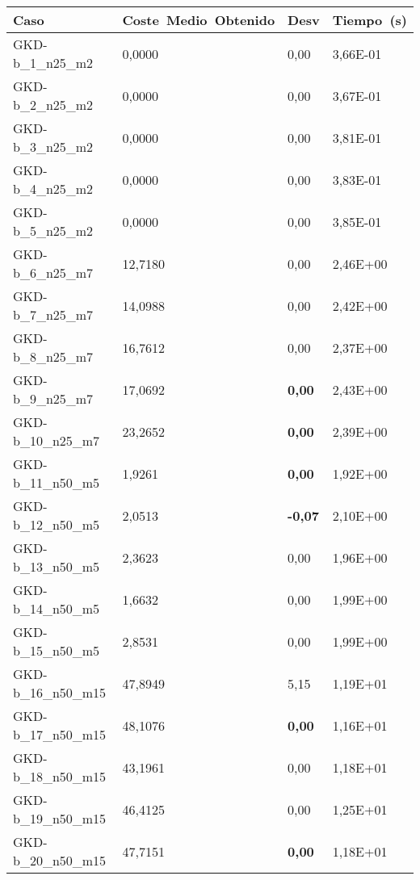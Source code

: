 \pagebreak

\begin{table}[!ht]%
    \centering    
    \begin{adjustbox}{height=12cm}
    \begin{tabular}{|l|l|l|l|}
    \hline
        Caso & Coste~Medio~Obtenido & Desv & Tiempo~(s) \\ \hline
		GKD-b\_1\_n25\_m2    & 0,0000   & 0,00           & 3,66E-01 \\ \hline
		GKD-b\_2\_n25\_m2    & 0,0000   & 0,00           & 3,67E-01 \\ \hline
		GKD-b\_3\_n25\_m2    & 0,0000   & 0,00           & 3,81E-01 \\ \hline
		GKD-b\_4\_n25\_m2    & 0,0000   & 0,00           & 3,83E-01 \\ \hline
		GKD-b\_5\_n25\_m2    & 0,0000   & 0,00           & 3,85E-01 \\ \hline
		GKD-b\_6\_n25\_m7    & 12,7180  & 0,00           & 2,46E+00 \\ \hline
		GKD-b\_7\_n25\_m7    & 14,0988  & 0,00           & 2,42E+00 \\ \hline
		GKD-b\_8\_n25\_m7    & 16,7612  & 0,00           & 2,37E+00 \\ \hline
		GKD-b\_9\_n25\_m7    & 17,0692  & \textbf{0,00}  & 2,43E+00 \\ \hline
		GKD-b\_10\_n25\_m7   & 23,2652  & \textbf{0,00}  & 2,39E+00 \\ \hline
		GKD-b\_11\_n50\_m5   & 1,9261   & \textbf{0,00}  & 1,92E+00 \\ \hline
		GKD-b\_12\_n50\_m5   & 2,0513   & \textbf{-0,07} & 2,10E+00 \\ \hline
		GKD-b\_13\_n50\_m5   & 2,3623   & 0,00           & 1,96E+00 \\ \hline
		GKD-b\_14\_n50\_m5   & 1,6632   & 0,00           & 1,99E+00 \\ \hline
		GKD-b\_15\_n50\_m5   & 2,8531   & 0,00           & 1,99E+00 \\ \hline
		GKD-b\_16\_n50\_m15  & 47,8949  & 5,15           & 1,19E+01 \\ \hline
		GKD-b\_17\_n50\_m15  & 48,1076  & \textbf{0,00}  & 1,16E+01 \\ \hline
		GKD-b\_18\_n50\_m15  & 43,1961  & 0,00           & 1,18E+01 \\ \hline
		GKD-b\_19\_n50\_m15  & 46,4125  & 0,00           & 1,25E+01 \\ \hline
		GKD-b\_20\_n50\_m15  & 47,7151  & \textbf{0,00}  & 1,18E+01 \\ \hline

\end{tabular}
\end{adjustbox}
\end{table}
